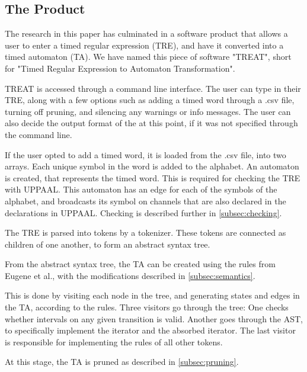 \subsection{The Product}\label{subsec:theProduct}
The research in this paper has culminated in a software product that allows a user to enter a timed regular expression (TRE), and have it converted into a timed automaton (TA).
We have named this piece of software "TREAT", short for "Timed Regular Expression to Automaton Transformation".

TREAT is accessed through a command line interface. The user can type in their TRE, along with a few options such as adding a timed word through a .csv file, turning off pruning, and silencing any warnings or info messages.
The user can also decide the output format of the at this point, if it was not specified through the command line.

If the user opted to add a timed word, it is loaded from the .csv file, into two arrays. Each unique symbol in the word is added to the alphabet.
An automaton is created, that represents the timed word. This is required for checking the TRE with UPPAAL. This automaton has an edge for each of the symbols of the alphabet, and broadcasts its symbol on channels that are also declared in the declarations in UPPAAL. Checking is described further in \cref{subsec:checking}.

The TRE is parsed into tokens by a tokenizer. These tokens are connected as children of one another, to form an abstract syntax tree. 

From the abstract syntax tree, the TA can be created using the rules from Eugene et al., with the modifications described in \cref{subsec:semantics}.

This is done by visiting each node in the tree, and generating states and edges in the TA, according to the rules. Three visitors go through the tree: One checks whether intervals on any given transition is valid. Another goes through the AST, to specifically implement the iterator and the absorbed iterator. The last visitor is responsible for implementing the rules of all other tokens.

At this stage, the TA is pruned as described in \cref{subsec:pruning}. 

